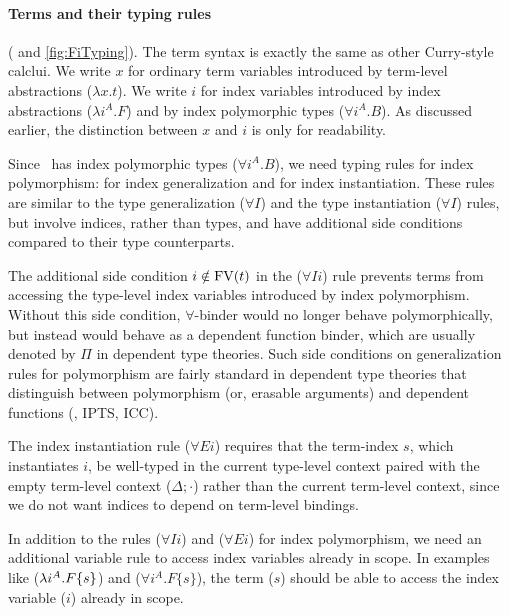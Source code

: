 \paragraph{Terms and their typing rules}( and \ref{fig:FiTyping}).\;
The term syntax is exactly the same as other Curry-style calclui.
We write $x$ for ordinary term variables introduced by
term-level abstractions ($\lambda x.t$).
We write $i$ for index variables introduced by
index abstractions ($\lambda i^A.F$) and by
index polymorphic types ($\forall i^A.B$). As discussed earlier,
the distinction between $x$ and $i$ is only for readability.

Since \Fi\ has index polymorphic types ($\forall i^A . B$),
we need typing rules for index polymorphism:
 for index generalization
and  for index instantiation.
These rules are similar to the type generalization ($\forall I$)
and the type instantiation ($\forall I$) rules, but involve
indices, rather than types, and have additional side conditions
compared to their type counterparts.

The additional side condition $i\notin\mathop{\mathrm{FV}}(t)$ in the ($\forall I i$) rule
prevents terms from accessing the type-level index variables introduced by
index polymorphism. Without this side condition, $\forall$-binder
would no longer behave polymorphically, but instead would behave as
a dependent function binder, which are usually denoted by $\Pi$ in
dependent type theories. Such side conditions on generalization rules
for polymorphism are fairly standard in dependent type theories that
distinguish between polymorphism (or, erasable arguments) and
dependent functions (\eg, IPTS\cite{LingerS08}, ICC\cite{Miquel01}).

The index instantiation rule ($\forall E i$) requires that
the term-index $s$, which instantiates $i$, be well-typed
in the current type-level context paired with the empty term-level context
($\Delta;\cdot$) rather than the current term-level context,
since we do not want indices to depend on term-level bindings.

In addition to the rules ($\forall I i$) and ($\forall E i$) for
index polymorphism, we need an additional variable rule 
to access index variables already in scope. In examples
like  ($\lambda i^A.F\{s\}$)  and ($\forall i^A.F\{s\}$), the term
($s$) should be able to access the index variable ($i$) already in scope.
